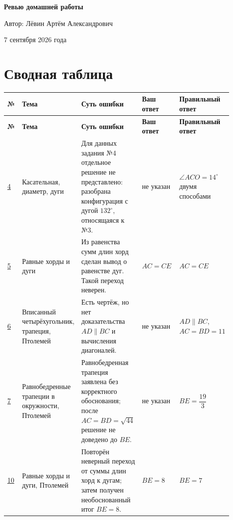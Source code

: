 \documentclass[12pt,a4paper]{article}
\begin{document}
\begin{titlepage}
\centering
\vspace*{0.22\textheight}
{\LARGE\bfseries Ревью домашней работы\par}
\vspace{2.5em}
{\large Автор: Лёвин Артём Александрович\par}
\vspace{1em}
{\large 7 сентября 2026 года\par}
\vfill
{}
\end{titlepage}

\newpage
\section*{Сводная таблица}
\small
\begin{longtable}{>{\centering\arraybackslash}p{0.07\linewidth}p{0.18\linewidth}p{0.28\linewidth}p{0.19\linewidth}p{0.19\linewidth}}
\toprule
\textbf{№} & \textbf{Тема} & \textbf{Суть ошибки} & \textbf{Ваш ответ} & \textbf{Правильный ответ}\\
\midrule
\endfirsthead
\toprule
\textbf{№} & \textbf{Тема} & \textbf{Суть ошибки} & \textbf{Ваш ответ} & \textbf{Правильный ответ}\\
\midrule
\endhead
\hyperref[task:4]{4} & Касательная, диаметр, дуги & Для данных задания №4 отдельное решение не представлено: разобрана конфигурация с дугой $132^\circ$, относящаяся к №3. & не указан & $\angle ACO=14^\circ$ двумя способами\\
\midrule
\hyperref[task:5]{5} & Равные хорды и дуги & Из равенства сумм длин хорд сделан вывод о равенстве дуг. Такой переход неверен. & $AC=CE$ & $AC=CE$\\
\midrule
\hyperref[task:6]{6} & Вписанный четырёхугольник, трапеция, Птолемей & Есть чертёж, но нет доказательства $AD\parallel BC$ и вычисления диагоналей. & не указан & $AD\parallel BC$, $AC=BD=11$\\
\midrule
\hyperref[task:7]{7} & Равнобедренные трапеции в окружности, Птолемей & Равнобедренная трапеция заявлена без корректного обоснования; после $AC=BD=\sqrt{44}$ решение не доведено до $BE$. & не указан & $BE=\dfrac{19}{3}$\\
\midrule
\hyperref[task:10]{10} & Равные хорды и дуги, Птолемей & Повторён неверный переход от суммы длин хорд к дугам; затем получен необоснованный итог $BE=8$. & $BE=8$ & $BE=7$\\
\bottomrule
\end{longtable}
\normalsize
\end{document}
